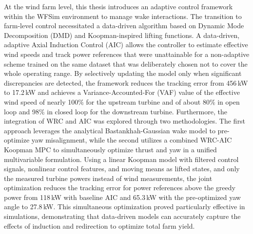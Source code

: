 At the wind farm level, this thesis introduces an adaptive control framework within the WFSim environment to manage wake interactions. The transition to farm-level control necessitated a data-driven algorithm based on Dynamic Mode Decomposition (DMD) and Koopman-inspired lifting functions. A data-driven, adaptive Axial Induction Control (AIC) allows the controller to estimate effective wind speeds and track power references that were unattainable for a non-adaptive scheme trained on the same dataset that was deliberately chosen not to cover the whole operating range. By selectively updating the model only when significant discrepancies are detected, the framework reduces the tracking error from 456\,kW to 17.2\,kW and achieves a Variance-Accounted-For (VAF) value of the effective wind speed of nearly 100\% for the upstream turbine and of about 80\% in open loop and 98\% in closed loop for the downstream turbine. Furthermore, the integration of WRC and AIC was explored through two methodologies. The first approach leverages the analytical Bastankhah-Gaussian wake model to pre-optimize yaw misalignment, while the second utilizes a combined WRC-AIC Koopman MPC to simultaneously optimize thrust and yaw in a unified multivariable formulation. Using a linear Koopman model with filtered control signals, nonlinear control features, and moving means as lifted states, and only the measured turbine powers instead of wind measurements, the joint optimization reduces the tracking error for power references above the greedy power from 118\,kW with baseline AIC and 65.3\,kW with the pre-optimized yaw angle to 27.8\,kW. This simultaneous optimization proved particularly effective in simulations, demonstrating that data-driven models can accurately capture the effects of induction and redirection to optimize total farm yield.

